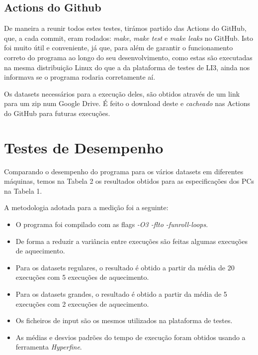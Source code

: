\documentclass{article}
\begin{document}
        \subsection{Actions do Github}
            De maneira a reunir todos estes testes, tirámos partido das Actions do GitHub, que, a cada
            commit, eram rodados: \textit{make}, \textit{make test} e \textit{make leaks} no GitHub. Isto foi muito útil
            e conveniente, já que, para além de garantir o funcionamento correto do programa ao longo do seu desenvolvimento,
            como estas são executadas na mesma distribuição Linux do que a da plataforma de testes de LI3,
            ainda nos informava se o programa rodaria corretamente aí.
            
            Os datasets necessários para a execução deles, são obtidos através de um link para um zip num
            Google Drive. É feito o download deste e \textit{cacheado} nas Actions do GitHub para futuras
            execuções.
    
    \pagebreak
    
    \section{Testes de Desempenho}
            Comparando o desempenho do programa para os vários datasets em diferentes máquinas,
            temos na Tabela 2 os resultados obtidos para as especificações dos PCs na Tabela 1.
            
            A metodologia adotada para a medição foi a seguinte:

            \begin{itemize}
                \item O programa foi compilado com as flags \emph{-O3 -flto -funroll-loops}.
                \item De forma a reduzir a variância entre execuções são feitas algumas execuções de aquecimento.
                \item Para os datasets regulares, o resultado é obtido a partir da média de 20 execuções
                com 5 execuções de aquecimento.
                \item Para os datasets grandes, o resultado é obtido a partir da média de 5 execuções
                com 2 execuções de aquecimento.
                \item Os ficheiros de input são os mesmos utilizados na plataforma de testes.
                \item As médias e desvios padrões do tempo de execução foram obtidos usando a ferramenta \textit{Hyperfine}.
            \end{itemize}
            
\end{document}
